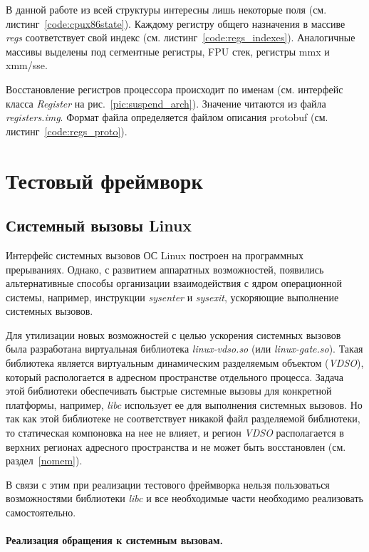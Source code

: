 В данной работе из всей структуры интересны лишь некоторые поля (см. листинг~\ref{code:cpux86state}). Каждому регистру общего назначения в массиве \textit{regs} соответствует свой индекс (см. листинг~\ref{code:regs_indexes}). Аналогичные массивы выделены под сегментные регистры, FPU стек, регистры mmx и xmm/sse.

Восстановление регистров процессора происходит по именам (см. интерфейс класса \textit{Register} на рис.~\ref{pic:suspend_arch}). Значение читаются из файла \textit{registers.img}. Формат файла определяется файлом описания protobuf (см. листинг~\ref{code:regs_proto}).


\section{Тестовый фреймворк}

\subsection{Системный вызовы Linux}\label{syscalls}

Интерфейс системных вызовов ОС Linux построен на программных прерываниях. Однако, с развитием аппаратных возможностей, появились альтернативные способы организации взаимодействия с ядром операционной системы, например, инструкции \textit{sysenter} и \textit{sysexit}, ускоряющие выполнение системных вызовов.

Для утилизации новых возможностей с целью ускорения системных вызовов была разработана виртуальная библиотека \textit{linux-vdso.so} (или \textit{linux-gate.so}). Такая библиотека является виртуальным динамическим разделяемым объектом (\textit{VDSO}), который распологается в адресном пространстве отдельного процесса. Задача этой библиотеки обеспечивать быстрые системные вызовы для конкретной платформы, например, \textit{libc} использует ее для выполнения системных вызовов. Но так как этой библиотеке не соответствует никакой файл разделяемой библиотеки, то статическая компоновка на нее не влияет, и регион \textit{VDSO} располагается в верхних регионах адресного пространства и не может быть восстановлен (см. раздел~\ref{nomem}).

В связи с этим при реализации тестового фреймворка нельзя пользоваться возможностями библиотеки \textit{libc} и все необходимые части необходимо реализовать самостоятельно.

\paragraph{Реализация обращения к системным вызовам.}


